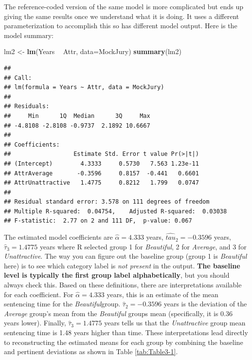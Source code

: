 \documentclass[]{book}
\newenvironment{Shaded}{\begin{snugshade}}{\end{snugshade}}
\newcommand{\KeywordTok}[1]{\textcolor[rgb]{0.13,0.29,0.53}{\textbf{#1}}}
\newcommand{\DataTypeTok}[1]{\textcolor[rgb]{0.13,0.29,0.53}{#1}}
\newcommand{\StringTok}[1]{\textcolor[rgb]{0.31,0.60,0.02}{#1}}
\newcommand{\OperatorTok}[1]{\textcolor[rgb]{0.81,0.36,0.00}{\textbf{#1}}}
\newcommand{\NormalTok}[1]{#1}
\theoremstyle{definition}
\theoremstyle{definition}
\theoremstyle{remark}
\begin{document}
The reference-coded version of the same model is more complicated but
ends up giving the same results once we understand what it is doing. It
uses a different parameterization to accomplish this so has different
model output. Here is the model summary:

\begin{Shaded}
\begin{Highlighting}[]
\NormalTok{lm2 <-}\StringTok{ }\KeywordTok{lm}\NormalTok{(Years }\OperatorTok{~}\StringTok{ }\NormalTok{Attr, }\DataTypeTok{data=}\NormalTok{MockJury)}
\KeywordTok{summary}\NormalTok{(lm2)}
\end{Highlighting}
\end{Shaded}

\begin{verbatim}
## 
## Call:
## lm(formula = Years ~ Attr, data = MockJury)
## 
## Residuals:
##     Min      1Q  Median      3Q     Max 
## -4.8108 -2.8108 -0.9737  2.1892 10.6667 
## 
## Coefficients:
##                  Estimate Std. Error t value Pr(>|t|)
## (Intercept)        4.3333     0.5730   7.563 1.23e-11
## AttrAverage       -0.3596     0.8157  -0.441   0.6601
## AttrUnattractive   1.4775     0.8212   1.799   0.0747
## 
## Residual standard error: 3.578 on 111 degrees of freedom
## Multiple R-squared:  0.04754,    Adjusted R-squared:  0.03038 
## F-statistic:  2.77 on 2 and 111 DF,  p-value: 0.067
\end{verbatim}

The estimated model coefficients are \(\hat{\alpha} = 4.333\) years,
\(\hat{tau}_2 =-0.3596\) years, \(\hat{\tau}_3=1.4775\) years where R
selected group 1 for \emph{Beautiful}, 2 for \emph{Average}, and 3 for
\emph{Unattractive}. The way you can figure out the baseline group
(group 1 is \emph{Beautiful} here) is to see which category label is
\emph{not present} in the output. \textbf{The baseline level is
typically the first group label alphabetically}, but you should always
check this. Based on these definitions, there are interpretations
available for each coefficient. For \(\hat{\alpha} = 4.333\) years, this
is an estimate of the mean sentencing time for the
\emph{Beautiful}group. \(\hat{\tau}_2 =-0.3596\) years is the deviation
of the \emph{Average} group's mean from the \emph{Beautiful} groups mean
(specifically, it is \(0.36\) years lower). Finally,
\(\hat{\tau}_3=1.4775\) years tells us that the \emph{Unattractive}
group mean sentencing time is 1.48 years higher than time. These
interpretations lead directly to reconstructing the estimated means for
each group by combining the baseline and pertinent deviations as shown
in Table \ref{tab:Table3-1}.
\end{document}

